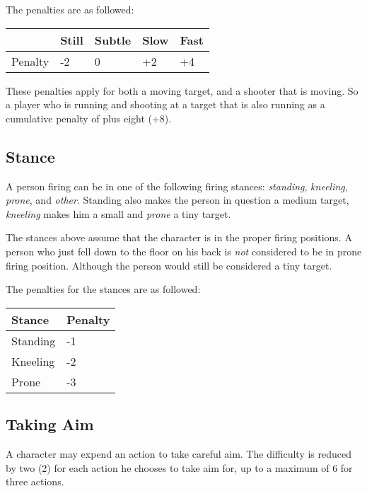 The penalties are as followed:

\begin{center}
  \begin{tabular}{| l | l | l | l | l |}
    \hline
    \,      & Still & Subtle & Slow & Fast \\ \hline
    Penalty & -2    & 0      & +2   & +4   \\
    \hline
  \end{tabular}
\end{center}

These penalties apply for both a moving target, and a shooter that is moving. So
a player who is running and shooting at a target that is also running as a
cumulative penalty of plus eight (+8).

\subsection{Stance}
\label{sub:6-Stance}

A person firing can be in one of the following firing stances: \emph{standing},
\emph{kneeling}, \emph{prone}, and \emph{other}. Standing also makes the person
in question a medium target, \emph{kneeling} makes him a small and \emph{prone}
a tiny target.

The stances above assume that the character is in the proper firing positions.
A person who just fell down to the floor on his back is \emph{not} considered to
be in prone firing position. Although the person would still be considered a
tiny target.

The penalties for the stances are as followed:

\begin{center}
  \begin{tabular}{| l | l |}
    \hline
    Stance   & Penalty \\ \hline
    Standing & -1      \\ \hline
    Kneeling & -2      \\ \hline
    Prone    & -3      \\
    \hline
  \end{tabular}
\end{center}

\subsection{Taking Aim}
\label{sub:6-Taking Aim}

A character may expend an action to take careful aim. The difficulty is reduced
by two (2) for each action he chooses to take aim for, up to a maximum of 6 for
three actions.

